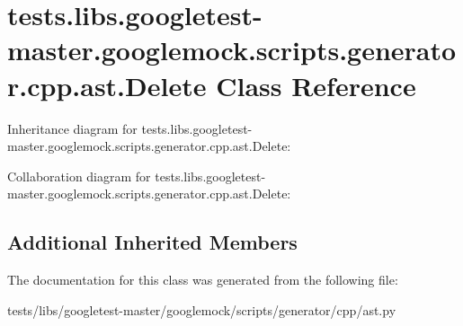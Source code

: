 \hypertarget{classtests_1_1libs_1_1googletest-master_1_1googlemock_1_1scripts_1_1generator_1_1cpp_1_1ast_1_1Delete}{}\section{tests.\+libs.\+googletest-\/master.googlemock.\+scripts.\+generator.\+cpp.\+ast.\+Delete Class Reference}
\label{classtests_1_1libs_1_1googletest-master_1_1googlemock_1_1scripts_1_1generator_1_1cpp_1_1ast_1_1Delete}


Inheritance diagram for tests.\+libs.\+googletest-\/master.googlemock.\+scripts.\+generator.\+cpp.\+ast.\+Delete\+:


Collaboration diagram for tests.\+libs.\+googletest-\/master.googlemock.\+scripts.\+generator.\+cpp.\+ast.\+Delete\+:
\subsection*{Additional Inherited Members}


The documentation for this class was generated from the following file\+:\begin{DoxyCompactItemize}
\item 
tests/libs/googletest-\/master/googlemock/scripts/generator/cpp/ast.\+py\end{DoxyCompactItemize}
